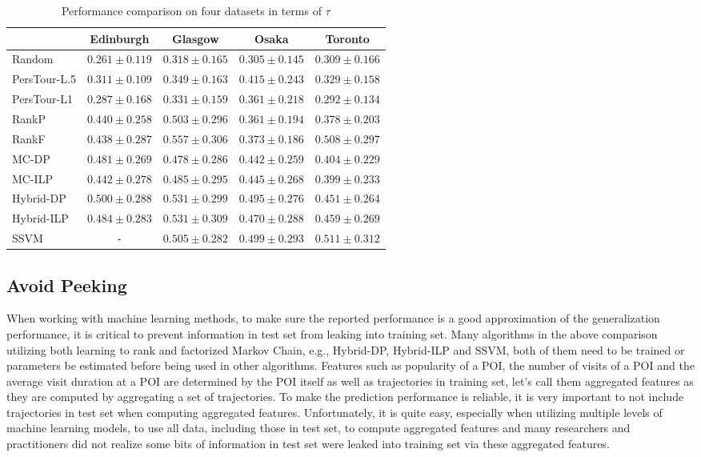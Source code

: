 \begin{table*}
\centering
\caption{Performance comparison on four datasets in terms of $\tau$}
\label{table:tau}
\begin{tabular}{l|cccc} \hline
 & Edinburgh & Glasgow & Osaka & Toronto \\ \hline
Random & $0.261\pm0.119$ & $0.318\pm0.165$ & $0.305\pm0.145$ & $0.309\pm0.166$ \\
PersTour-L.5 & $0.311\pm0.109$ & $0.349\pm0.163$ & $0.415\pm0.243$ & $0.329\pm0.158$ \\
PersTour-L1 & $0.287\pm0.168$ & $0.331\pm0.159$ & $0.361\pm0.218$ & $0.292\pm0.134$ \\
RankP & $0.440\pm0.258$ & $0.503\pm0.296$ & $0.361\pm0.194$ & $0.378\pm0.203$ \\
RankF & $0.438\pm0.287$ & $\mathbf{0.557\pm0.306}$ & $0.373\pm0.186$ & $0.508\pm0.297$ \\
MC-DP & $0.481\pm0.269$ & $0.478\pm0.286$ & $0.442\pm0.259$ & $0.404\pm0.229$ \\
MC-ILP & $0.442\pm0.278$ & $0.485\pm0.295$ & $0.445\pm0.268$ & $0.399\pm0.233$ \\
Hybrid-DP & $0.500\pm0.288$ & $0.531\pm0.299$ & $0.495\pm0.276$ & $0.451\pm0.264$ \\
Hybrid-ILP & $0.484\pm0.283$ & $0.531\pm0.309$ & $0.470\pm0.288$ & $0.459\pm0.269$ \\
SSVM & - & $0.505\pm0.282$ & $\mathbf{0.499\pm0.293}$ & $\mathbf{0.511\pm0.312}$ \\
\hline
\end{tabular}
\end{table*}

\subsection{Avoid Peeking}
When working with machine learning methods, to make sure the reported performance is a good approximation
of the generalization performance, it is critical to prevent information in test set from leaking into
training set.
Many algorithms in the above comparison utilizing both learning to rank and factorized Markov Chain, 
e.g., Hybrid-DP, Hybrid-ILP and SSVM,
both of them need to be trained or parameters be estimated before being used in other algorithms.
Features such as popularity of a POI, the number of visits of a POI and the average visit duration at a POI are
determined by the POI itself as well as trajectories in training set, let's call them aggregated features as they are 
computed by aggregating a set of trajectories.
To make the prediction performance is reliable, it is very important to not include trajectories in test set 
when computing aggregated features.
Unfortunately, it is quite easy, especially when utilizing multiple levels of machine learning models,
to use all data, including those in test set, to compute aggregated features and many researchers and 
practitioners did not realize some bits of information in test set were leaked into training set via these aggregated features.


